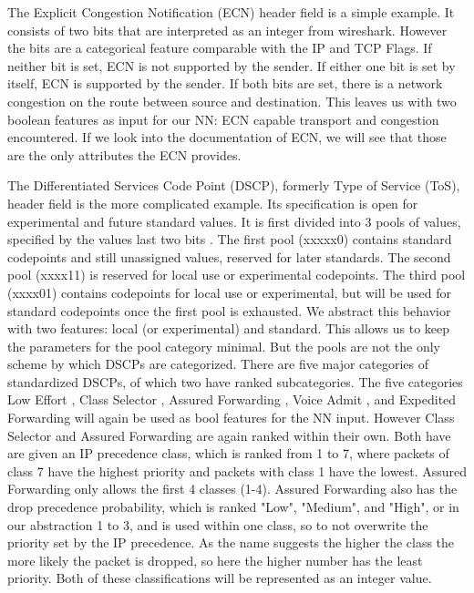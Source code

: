 \documentclass[
	ngerman,
	ruledheaders=section,%
	class=report,%
	thesis={type=bachelor},%
	accentcolor=9c,%
	custommargins=true,%
	marginpar=false,%
	parskip=half-,%
	fontsize=11pt,%
]{tudapub}
\begin{document}
The Explicit Congestion Notification (ECN) \cite{floydAdditionExplicitCongestion} header field is a simple example.
It consists of two bits that are interpreted as an integer from wireshark.
However the bits are a categorical feature comparable with the IP and TCP Flags.
If neither bit is set, ECN is not supported by the sender.
If either one bit is set by itself, ECN is supported by the sender.
If both bits are set, there is a network congestion on the route between source and destination.
This leaves us with two boolean features as input for our NN: ECN capable transport and congestion encountered.
If we look into the documentation of ECN, we will see that those are the only attributes the ECN provides.


The Differentiated Services Code Point (DSCP), formerly Type of Service (ToS), header field is the more complicated example.
Its specification is open for experimental and future standard values.
It is first divided into 3 pools of values, specified by the values last two bits \cite{DifferentiatedServicesField}.
The first pool (xxxxx0) contains standard codepoints and still unassigned values, reserved for later standards.
The second pool (xxxx11) is reserved for local use or experimental codepoints.
The third pool (xxxx01) contains codepoints for local use or experimental, but will be used for standard codepoints once the first pool is exhausted.
We abstract this behavior with two features: local (or experimental) and standard.
This allows us to keep the parameters for the pool category minimal.
But the pools are not the only scheme by which DSCPs are categorized.
There are five major categories of standardized DSCPs, of which two have ranked subcategories.
The five categories Low Effort \cite{blessLowerEffortPerHopBehavior}, Class Selector \cite{nicholsDefinitionDifferentiatedServices}, Assured Forwarding \cite{wroclawskiAssuredForwardingPHB}, Voice Admit \cite{bakerDifferentiatedServicesCode}, and Expedited Forwarding \cite{firoiuExpeditedForwardingPHB} will again be used as bool features for the NN input.
However Class Selector and Assured Forwarding are again ranked within their own.
Both have are given an IP precedence class, which is ranked from 1 to 7, where packets of class 7 have the highest priority and packets with class 1 have the lowest.
Assured Forwarding only allows the first 4 classes (1-4).
Assured Forwarding also has the drop precedence probability, which is ranked "Low", "Medium", and "High", or in our abstraction 1 to 3, and is used within one class, so to not overwrite the priority set by the IP precedence.
As the name suggests the higher the class the more likely the packet is dropped, so here the higher number has the least priority.
Both of these classifications will be represented as an integer value.
\end{document}
